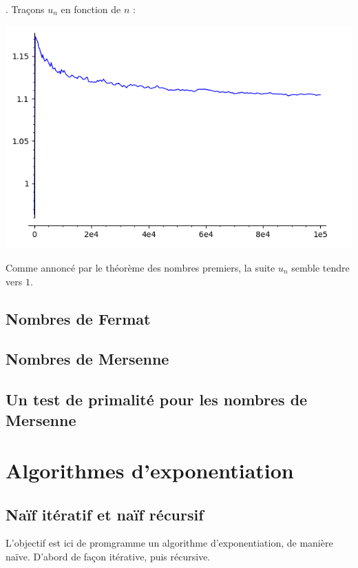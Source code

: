 \documentclass[titlepage]{article}
\begin{document}
    . Traçons $u_n$ en fonction de $n$ : 
    \begin{center}
        \includegraphics[scale=0.5]{Ressources/2022-04-27-10:20:31-screenshot.png}
    \end{center}
    Comme annoncé par le théorème des nombres premiers, la suite $u_n$ semble tendre vers $1$.
    \bigbreak

    \subsection{Nombres de Fermat}

    \subsection{Nombres de Mersenne}

    \subsection{Un test de primalité pour les nombres de Mersenne}

    \section{Algorithmes d'exponentiation}
    \subsection{Naïf itératif et naïf récursif}
    L'objectif est ici de promgramme un algorithme d'exponentiation, de manière naïve. D'abord de façon itérative, puis récursive.

    
\end{document}
